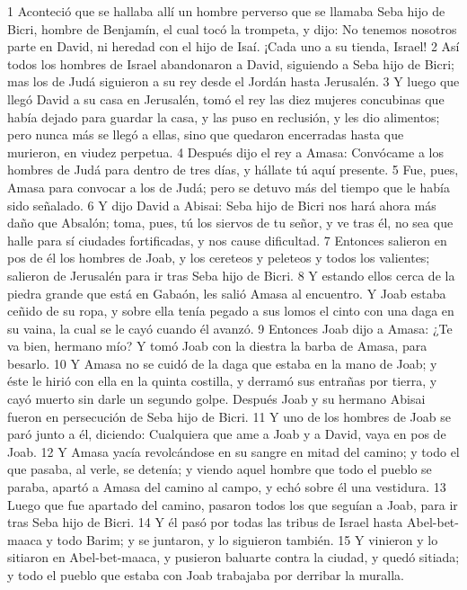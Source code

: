 1 Aconteció que se hallaba allí un hombre perverso que se llamaba Seba hijo de Bicri, hombre de Benjamín, el cual tocó la trompeta, y dijo: No tenemos nosotros parte en David, ni heredad con el hijo de Isaí. ¡Cada uno a su tienda, Israel! 
2 Así todos los hombres de Israel abandonaron a David, siguiendo a Seba hijo de Bicri; mas los de Judá siguieron a su rey desde el Jordán hasta Jerusalén.
3 Y luego que llegó David a su casa en Jerusalén, tomó el rey las diez mujeres concubinas que había dejado para guardar la casa, y las puso en reclusión, y les dio alimentos; pero nunca más se llegó a ellas, sino que quedaron encerradas hasta que murieron, en viudez perpetua.
4 Después dijo el rey a Amasa: Convócame a los hombres de Judá para dentro de tres días, y hállate tú aquí presente.
5 Fue, pues, Amasa para convocar a los de Judá; pero se detuvo más del tiempo que le había sido señalado.
6 Y dijo David a Abisai: Seba hijo de Bicri nos hará ahora más daño que Absalón; toma, pues, tú los siervos de tu señor, y ve tras él, no sea que halle para sí ciudades fortificadas, y nos cause dificultad.
7 Entonces salieron en pos de él los hombres de Joab, y los cereteos y peleteos y todos los valientes; salieron de Jerusalén para ir tras Seba hijo de Bicri.
8 Y estando ellos cerca de la piedra grande que está en Gabaón, les salió Amasa al encuentro. Y Joab estaba ceñido de su ropa, y sobre ella tenía pegado a sus lomos el cinto con una daga en su vaina, la cual se le cayó cuando él avanzó.
9 Entonces Joab dijo a Amasa: ¿Te va bien, hermano mío? Y tomó Joab con la diestra la barba de Amasa, para besarlo.
10 Y Amasa no se cuidó de la daga que estaba en la mano de Joab; y éste le hirió con ella en la quinta costilla, y derramó sus entrañas por tierra, y cayó muerto sin darle un segundo golpe. Después Joab y su hermano Abisai fueron en persecución de Seba hijo de Bicri.
11 Y uno de los hombres de Joab se paró junto a él, diciendo: Cualquiera que ame a Joab y a David, vaya en pos de Joab.
12 Y Amasa yacía revolcándose en su sangre en mitad del camino; y todo el que pasaba, al verle, se detenía; y viendo aquel hombre que todo el pueblo se paraba, apartó a Amasa del camino al campo, y echó sobre él una vestidura.
13 Luego que fue apartado del camino, pasaron todos los que seguían a Joab, para ir tras Seba hijo de Bicri.
14 Y él pasó por todas las tribus de Israel hasta Abel-bet-maaca y todo Barim; y se juntaron, y lo siguieron también.
15 Y vinieron y lo sitiaron en Abel-bet-maaca, y pusieron baluarte contra la ciudad, y quedó sitiada; y todo el pueblo que estaba con Joab trabajaba por derribar la muralla.
